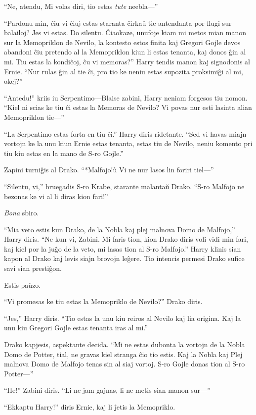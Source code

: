 ``Ne, atendu, Mi volas diri, tio estas \emph{tute} neebla—''

``Pardonu min, ĉiu vi ĉiuj estas staranta ĉirkaŭ tie antendanta por
flugi sur balailoj? Jes vi estas. Do silentu. Ĉiaokaze, unufoje kiam
mi metos mian manon sur la Memopriklon de Nevilo, la kontesto estos
finita kaj Gregori Gojle devos abandoni ĉiu pretendo al la Memopriklon
kiun li estas tenanta, kaj donos ĝin al mi. Tiu estas la kondiĉoj, ĉu
vi memoras?'' Harry tendis manon kaj signodonis al Ernie.  ``Nur rulas
ĝin al tie ĉi, pro tio ke neniu estas supozita proksimiĝi al mi,
okej?''

``Antedu!'' kriis iu Serpentimo—Blaise zabini, Harry neniam forgesos
tiu nomon. ``Kiel ni scias ke tiu ĉi estas la Memoras de Nevilo? Vi
povas nur esti lasinta alian Memopriklon tie—''

``La Serpentimo estas forta en tiu ĉi.'' Harry diris ridetante. ``Sed
vi havas miajn vortojn ke la unu kiun Ernie estas tenanta, estas tiu
de Nevilo, neniu komento pri tiu kiu estas en la mano de S-ro Gojle.''

Zapini turniĝis al Drako. ``*Malfojo!ù Vi ne nur lasos lin foriri tiel—''

``Silentu, vi,'' bruegadis S-ro Krabe, starante malantaŭ Drako. ``S-ro
Malfojo ne bezonas ke vi al li diras kion fari!''

\emph{Bona} sbiro.

``Mia veto estis kun Drako, de la Nobla kaj plej malnova Domo de
Malfojo,'' Harry diris. ``Ne kun vi, Zabini. Mi faris tion, kion Drako
diris voli vidi min fari, kaj kiel por la juĝo de la veto, mi lasas
tion al S-ro Malfojo.'' Harry klinis sian kapon al Drako kaj levis
siajn brovojn leĝere. Tio intencis permesi Drako sufice savi sian
prestiĝon.


Estis paŭzo.

``Vi promesas ke tiu estas la Memopriklo de Nevilo?'' Drako diris.

``Jes,'' Harry diris. ``Tio estas la unu kiu reiros al Nevilo kaj lia origina. Kaj la unu kiu Gregori Gojle estas tenanta iras al mi.''

Drako kapjesis, aspektante decida. ``Mi ne estas dubonta la vortojn de
la Nobla Domo de Potter, tial, ne gravas kiel stranga ĉio tio
estis. Kaj la Nobla kaj Plej malnova Domo de Malfojo tenas sin al siaj
vortoj. S-ro Gojle donas tion al S-ro Potter—''

``He!'' Zabini diris. ``Li ne jam gajnas, li ne metis sian manon sur—''

``Ekkaptu Harry!'' diris Ernie, kaj li ĵetis la Memopriklo.

